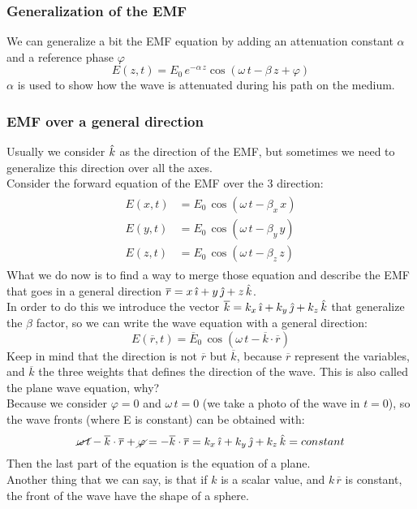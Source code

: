 \subsubsection*{Generalization of the EMF}
We can generalize a bit the EMF equation by adding an attenuation constant $\alpha$ and a reference phase $\varphi$
\begin{equation}\label{eq:wave_equation_generalized}
    E(z,t)=E_0\,e^{-\alpha\,z}\cos(\omega\,t-\beta\,z+\varphi)
\end{equation}
$\alpha$ is used to show how the wave is attenuated during his path on the medium.
\subsubsection*{EMF over a general direction}
Usually we consider $\hat{\mathnormal{k}}$ as the direction of the EMF, but sometimes we need to generalize this direction over all the axes.\\
Consider the forward equation of the EMF over the 3 direction:
\begin{align}\label{eq:electric_field_3_axes}
    \begin{split}
        E(x,t)&=E_0\,\cos(\omega\,t-\beta_x\,x)\\[5pt]
        E(y,t)&=E_0\,\cos(\omega\,t-\beta_y\,y)\\[5pt]
        E(z,t)&=E_0\,\cos(\omega\,t-\beta_z\,z)
    \end{split}
\end{align}
What we do now is to find a way to merge those equation and describe the EMF that goes in a general direction $\overline{r}=x\,\hat{\imath}+y\,\hat{\jmath}+z\,\hat{\mathnormal{k}}$.\\
In order to do this we introduce the vector $\overline{k}=k_x\,\hat{\imath}+k_y\,\hat{\jmath}+k_z\,\hat{\mathnormal{k}}$ that generalize the $\beta$ factor, so we can write the wave equation with a general direction:
\begin{equation}
    E(\overline{r},t)=\overline{E}_0\,\cos(\omega\,t-\overline{k}\cdot\overline{r})
\end{equation}
Keep in mind that the direction is not $\overline{r}$ but $\overline{k}$, because $\overline{r}$ represent the variables, and $\overline{k}$ the three weights that defines the direction of the wave.
This is also called the plane wave equation, why?\\
Because we consider $\varphi = 0$ and $\omega\,t=0$ (we take a photo of the wave in $t=0$), so the wave fronts (where E is constant) can be obtained with:
\begin{equation}
    \cancel{\omega\,t}-\overline{k}\cdot\overline{r}+\cancel{\varphi}=-\overline{k}\cdot\overline{r}=k_x\,\hat{\imath}+k_y\,\hat{\jmath}+k_z\,\hat{\mathnormal{k}}=constant
\end{equation}
Then the last part of the equation is the equation of a plane.\\
Another thing that we can say, is that if $k$ is a scalar value, and $k\,\overline{r}$ is constant, the front of the wave have the shape of a sphere.